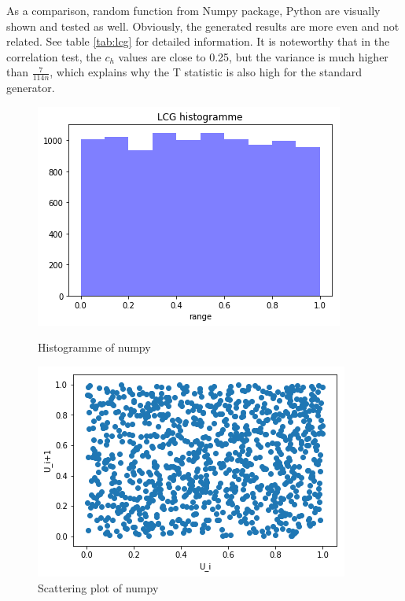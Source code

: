 As a comparison, random function from Numpy package, Python are visually shown and tested as well. Obviously, the generated results are more even and not related. See table \ref{tab:lcg} for detailed information. It is noteworthy that in the correlation test, the $c_h$ values are close to 0.25, but the variance is much higher than $\frac{7}{114n}$, which explains why the T statistic is also high for the standard generator.
\begin{figure}[h]
\centering
\begin{minipage}{.5\textwidth}
  \centering
  \includegraphics[width=0.95\linewidth, height = 0.75\linewidth]{figures/numpyHist.png}
  \caption{Histogramme of numpy}
    \label{fig:numpyHist}
\end{minipage}%
\begin{minipage}{.5\textwidth}
  \centering
  \includegraphics[width=0.95\linewidth, height = 0.75\linewidth]{figures/numpyScat.png}
  \caption{Scattering plot of numpy}
  \label{fig:numpyScat}
\end{minipage}
\end{figure}

